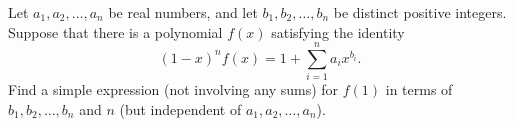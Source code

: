 Let $a_1, a_2, \dots, a_n$ be real numbers, and let $b_1, b_2, \dots,
b_n$ be distinct positive integers. Suppose that there is a polynomial
$f(x)$ satisfying the identity
\[
(1-x)^n f(x) = 1 + \sum_{i=1}^n a_i x^{b_i}.
\]
Find a simple expression (not involving any sums) for $f(1)$ in terms
of $b_1, b_2, \dots, b_n$ and $n$ (but independent of $a_1, a_2,
\dots, a_n$).
